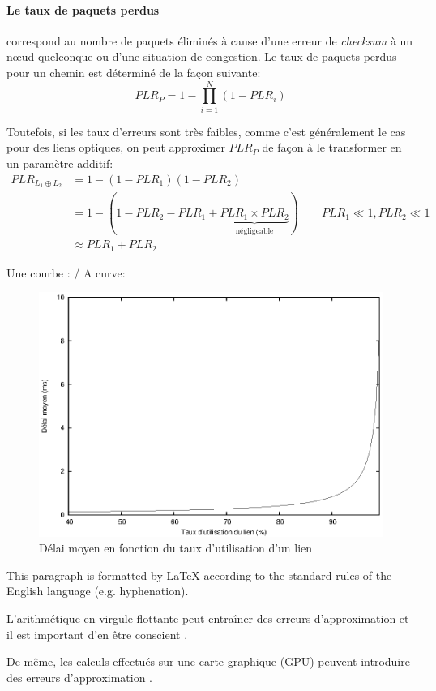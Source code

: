 \paragraph{Le taux de paquets perdus} correspond au nombre de paquets
éliminés à cause d'une erreur de \emph{checksum} à un n\oe{}ud
quelconque ou d'une situation de congestion. Le taux de paquets perdus
pour un chemin est déterminé de la façon suivante:
\begin{equation}
  \label{eq:genPLR}
  PLR_P = 1 - \prod_{i=1}^N(1 - PLR_i)
\end{equation}

Toutefois, si les taux d'erreurs sont très faibles, comme c'est
généralement le cas pour des liens optiques, on peut approximer
$PLR_P$ de façon à le transformer en un paramètre additif:
\begin{equation}
  \label{eq:approxPLR}
  \begin{split}
    PLR_{L_1 \oplus L_2} &= 1 - (1 - PLR_1)(1 - PLR_2)\\
    &= 1 - (1 - PLR_2 - PLR_1 + \underbrace{PLR_1
      \times PLR_2}_\text{négligeable})\qquad PLR_1 \ll 1,
    PLR_2 \ll 1\\
    &\approx PLR_1 + PLR_2
  \end{split}
\end{equation}

\clearpage

Une courbe : / A curve:
\begin{figure}[htb]
\centering
\includegraphics[width=5in]{LinkUsage}
\caption{Délai moyen en fonction du taux d'utilisation d'un lien}
\label{fig:LinkUse}
\end{figure}

This paragraph is formatted by \LaTeX{} according to the standard rules of the
English language (\mbox{e.g.} hyphenation).

L'arithmétique en virgule flottante peut entraîner des erreurs
d'approximation et il est important d'en être conscient
\cite{Rossi2011}.

De même, les calculs effectués sur une carte graphique (GPU) peuvent
introduire des erreurs d'approximation \cite{DeSantis2002, Cohen2006,
  Thorsson2014, Schirmer2012, Sakai2015, Electrical2006,
  Min2016, Massicotte2013, Kaliouby1987, Daintith2010, Haist2014, Kizza2013,
  Manasreh2011, Brydson1999, Boyce2002}.
